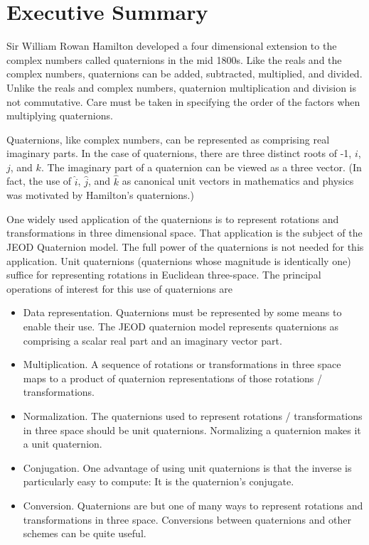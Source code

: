 %
%
% 
%

\chapter*{Executive Summary}
Sir William Rowan Hamilton developed a four dimensional extension to the complex
numbers called quaternions in the mid 1800s. Like the reals and the complex
numbers, quaternions can be added, subtracted, multiplied, and divided.
Unlike the reals and complex numbers, quaternion multiplication and division
is not commutative. Care must be taken in specifying the order of the
factors when multiplying quaternions.

Quaternions, like complex numbers, can be represented as comprising real
imaginary parts. In the case of quaternions, there are three distinct roots
of -1, $i$, $j$, and $k$. The imaginary part of a quaternion can be viewed
as a three vector. (In fact, the use of $\hat i$, $\hat j$, and $\hat k$ as
canonical unit vectors in mathematics and physics was motivated by Hamilton's
quaternions.)

One widely used application of the quaternions is to represent rotations and
transformations in three dimensional space.
That application is the subject of the JEOD Quaternion model.
The full power of the quaternions is not needed for this application.
Unit quaternions (quaternions whose magnitude is identically one) suffice
for representing rotations in Euclidean three-space.
The principal operations of interest for this use of quaternions are
\begin{itemize}
\item Data representation.
Quaternions must be represented by some means to enable their use.
The JEOD quaternion model represents quaternions as comprising
a scalar real part and an imaginary vector part.
\item Multiplication.
A sequence of rotations or transformations in three space
maps to a product of quaternion representations of those rotations /
transformations.
\item Normalization.
The quaternions used to represent rotations / transformations in three space
should be unit quaternions. Normalizing a quaternion makes it a unit quaternion.
\item Conjugation.
One advantage of using unit quaternions is that the inverse is particularly
easy to compute: It is the quaternion's conjugate.
\item Conversion.
Quaternions are but one of many ways to represent rotations and transformations
in three space. Conversions between quaternions and other schemes can be
quite useful.
\end{itemize}
